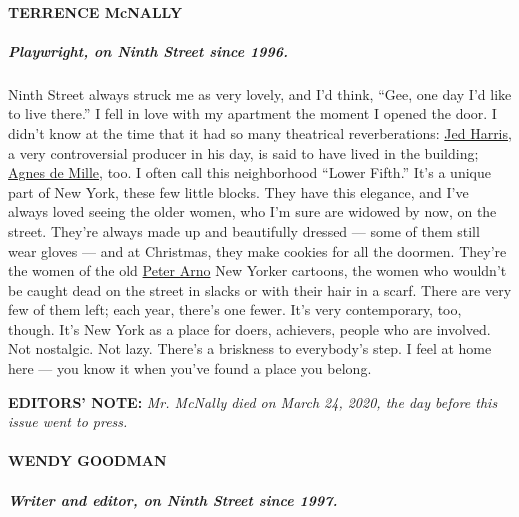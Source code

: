 \hypertarget{terrence-mcnally}{%
\paragraph{TERRENCE McNALLY}\label{terrence-mcnally}}

\hypertarget{playwright-on-ninth-street-since-1996}{%
\subparagraph{\texorpdfstring{\textbf{Playwright, on Ninth Street since
1996.}}{Playwright, on Ninth Street since 1996.}}\label{playwright-on-ninth-street-since-1996}}

Ninth Street always struck me as very lovely, and I'd think, ``Gee, one
day I'd like to live there.'' I fell in love with my apartment the
moment I opened the door. I didn't know at the time that it had so many
theatrical reverberations:
\href{https://www.nytimes.com/1979/11/16/archives/jed-harris-broadway-producer-and-director-for-30-years-dead.html}{Jed
Harris}, a very controversial producer in his day, is said to have lived
in the building;
\href{https://www.nytimes.com/1993/10/08/obituaries/agnes-de-mille-88-dance-visionary-is-dead.html}{Agnes
de Mille}, too. I often call this neighborhood ``Lower Fifth.'' It's a
unique part of New York, these few little blocks. They have this
elegance, and I've always loved seeing the older women, who I'm sure are
widowed by now, on the street. They're always made up and beautifully
dressed --- some of them still wear gloves --- and at Christmas, they
make cookies for all the doormen. They're the women of the old
\href{https://www.nytimes.com/1968/02/23/archives/peter-arno-cartoonist-64-dies-with-the-new-yorker-43-years-peter.html}{Peter
Arno} New Yorker cartoons, the women who wouldn't be caught dead on the
street in slacks or with their hair in a scarf. There are very few of
them left; each year, there's one fewer. It's very contemporary, too,
though. It's New York as a place for doers, achievers, people who are
involved. Not nostalgic. Not lazy. There's a briskness to everybody's
step. I feel at home here --- you know it when you've found a place you
belong.

\textbf{EDITORS' NOTE:} \emph{Mr. McNally died on March 24, 2020, the
day before this issue went to press.}

\hypertarget{wendy-goodman}{%
\paragraph{WENDY GOODMAN}\label{wendy-goodman}}

\hypertarget{writer-and-editor-on-ninth-street-since-1997}{%
\subparagraph{\texorpdfstring{\textbf{Writer and editor, on Ninth Street
since
1997.}}{Writer and editor, on Ninth Street since 1997.}}\label{writer-and-editor-on-ninth-street-since-1997}}


